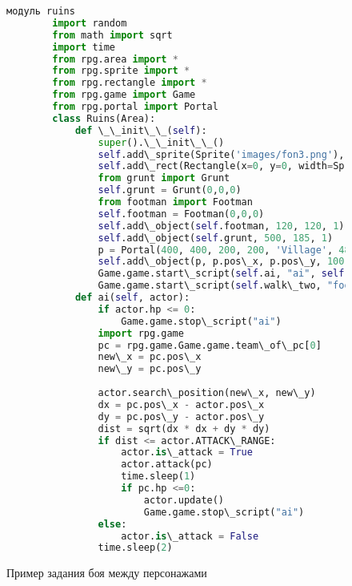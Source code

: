 \begin{figure}[H]
	\begin{lstlisting}[language=Python]
		модуль ruins
		import random
		from math import sqrt
		import time
		from rpg.area import *
		from rpg.sprite import *
		from rpg.rectangle import *
		from rpg.game import Game
		from rpg.portal import Portal
		class Ruins(Area):
			def \_\_init\_\_(self):
				super().\_\_init\_\_()
				self.add\_sprite(Sprite('images/fon3.png'), 590, 400, 0)
				self.add\_rect(Rectangle(x=0, y=0, width=Sprite('images/fon3.png').image.width(), height=Sprite('images/fon3.png').image.height()))
				from grunt import Grunt
				self.grunt = Grunt(0,0,0)
				from footman import Footman
				self.footman = Footman(0,0,0)
				self.add\_object(self.footman, 120, 120, 1)
				self.add\_object(self.grunt, 500, 185, 1)
				p = Portal(400, 400, 200, 200, 'Village', 480, 100)
				self.add\_object(p, p.pos\_x, p.pos\_y, 100)
				Game.game.start\_script(self.ai, "ai", self.grunt)
				Game.game.start\_script(self.walk\_two, "footman", 50, 50)	
			def ai(self, actor):
				if actor.hp <= 0:
					Game.game.stop\_script("ai")
				import rpg.game
				pc = rpg.game.Game.game.team\_of\_pc[0]
				new\_x = pc.pos\_x
				new\_y = pc.pos\_y
				
				actor.search\_position(new\_x, new\_y)
				dx = pc.pos\_x - actor.pos\_x
				dy = pc.pos\_y - actor.pos\_y
				dist = sqrt(dx * dx + dy * dy)
				if dist <= actor.ATTACK\_RANGE:
					actor.is\_attack = True
					actor.attack(pc)
					time.sleep(1)
					if pc.hp <=0:
						actor.update()
						Game.game.stop\_script("ai")
				else:
					actor.is\_attack = False
				time.sleep(2)
\end{lstlisting}  
\caption{Пример задания боя между персонажами}
\label{battle2:image}
\end{figure}

